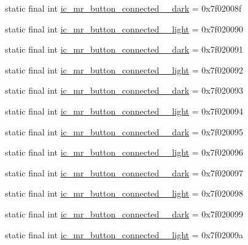\begin{CompactItemize}
\item 
static final int \hyperlink{classandroid_1_1support_1_1v4_1_1_r_1_1drawable_5ded18ef4130afe8e0cf4c1b9f0a4035}{ic\_\-mr\_\-button\_\-connected\_\_\-dark} = 0x7f02008f
\item 
static final int \hyperlink{classandroid_1_1support_1_1v4_1_1_r_1_1drawable_124b88b29e41fc46ae53cadd01020f0b}{ic\_\-mr\_\-button\_\-connected\_\_\-light} = 0x7f020090
\item 
static final int \hyperlink{classandroid_1_1support_1_1v4_1_1_r_1_1drawable_44faeec3e23320d1fa197a2c602c75fa}{ic\_\-mr\_\-button\_\-connected\_\_\-dark} = 0x7f020091
\item 
static final int \hyperlink{classandroid_1_1support_1_1v4_1_1_r_1_1drawable_fd2f86cb4b23cc70ab307524a70e4e0e}{ic\_\-mr\_\-button\_\-connected\_\_\-light} = 0x7f020092
\item 
static final int \hyperlink{classandroid_1_1support_1_1v4_1_1_r_1_1drawable_e520ad695050f69c0842e7d46d21f79e}{ic\_\-mr\_\-button\_\-connected\_\_\-dark} = 0x7f020093
\item 
static final int \hyperlink{classandroid_1_1support_1_1v4_1_1_r_1_1drawable_40e5c701eab72bd45ed072118f9ed729}{ic\_\-mr\_\-button\_\-connected\_\_\-light} = 0x7f020094
\item 
static final int \hyperlink{classandroid_1_1support_1_1v4_1_1_r_1_1drawable_ff62ec91a3d8e5c080aaef550ab8cae4}{ic\_\-mr\_\-button\_\-connected\_\_\-dark} = 0x7f020095
\item 
static final int \hyperlink{classandroid_1_1support_1_1v4_1_1_r_1_1drawable_a12ec89ffaaf0b9f5f061a11326d0dbf}{ic\_\-mr\_\-button\_\-connected\_\_\-light} = 0x7f020096
\item 
static final int \hyperlink{classandroid_1_1support_1_1v4_1_1_r_1_1drawable_d36183a90f6228685d1be0cdb7b7dccb}{ic\_\-mr\_\-button\_\-connected\_\_\-dark} = 0x7f020097
\item 
static final int \hyperlink{classandroid_1_1support_1_1v4_1_1_r_1_1drawable_d051e57eaa886b8325f910ac2d9e18e3}{ic\_\-mr\_\-button\_\-connected\_\_\-light} = 0x7f020098
\item 
static final int \hyperlink{classandroid_1_1support_1_1v4_1_1_r_1_1drawable_9782953ae63d788bb45f52f6b9afbc99}{ic\_\-mr\_\-button\_\-connected\_\_\-dark} = 0x7f020099
\item 
static final int \hyperlink{classandroid_1_1support_1_1v4_1_1_r_1_1drawable_7a7cff0fc1d10cdb4bc01c7b3f4ed0ae}{ic\_\-mr\_\-button\_\-connected\_\_\-light} = 0x7f02009a

\end{CompactItemize}
